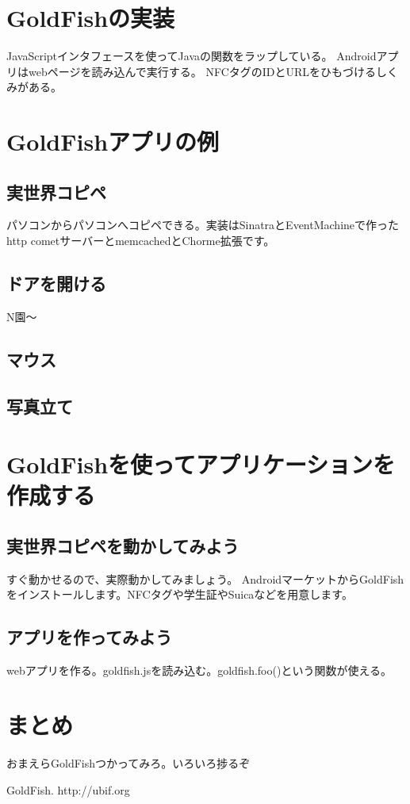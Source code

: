 \section{GoldFishの実装}
JavaScriptインタフェースを使ってJavaの関数をラップしている。
Androidアプリはwebページを読み込んで実行する。
NFCタグのIDとURLをひもづけるしくみがある。

\section{GoldFishアプリの例}
\subsection{実世界コピペ}
パソコンからパソコンへコピペできる。実装はSinatraとEventMachineで作ったhttp cometサーバーとmemcachedとChorme拡張です。

\subsection{ドアを開ける}
N園〜

\subsection{マウス}

\subsection{写真立て}


\section{GoldFishを使ってアプリケーションを作成する}
\subsection{実世界コピペを動かしてみよう}
すぐ動かせるので、実際動かしてみましょう。
AndroidマーケットからGoldFishをインストールします。NFCタグや学生証やSuicaなどを用意します。

\subsection{アプリを作ってみよう}
webアプリを作る。goldfish.jsを読み込む。goldfish.foo()という関数が使える。


\section{まとめ}
おまえらGoldFishつかってみろ。いろいろ捗るぞ


\begin{thebibliography}{10}

GoldFish. http://ubif.org

\end{thebibliography}

